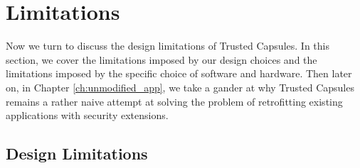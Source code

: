\chapter{Limitations}
\label{sec:limitations}

Now we turn to discuss the design limitations of Trusted Capsules. In this section, we cover the limitations imposed by our design choices and the
limitations imposed by the specific choice of software and hardware. Then later on, in Chapter \ref{ch:unmodified_app}, we take a gander at why Trusted Capsules remains a rather naive attempt at
solving the problem of retrofitting existing applications with security
extensions.

\section{Design Limitations}
